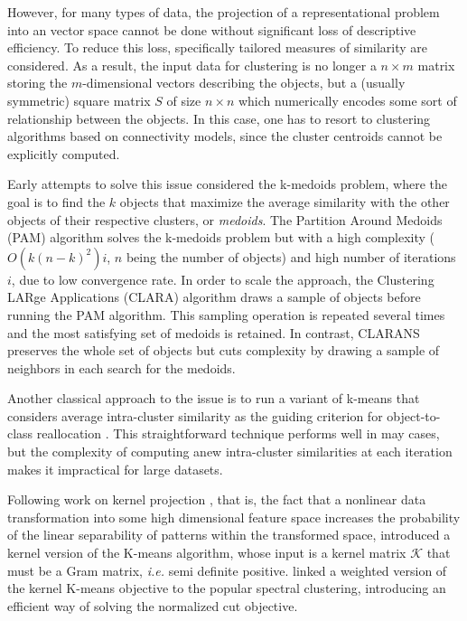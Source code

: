 \documentclass[natbib,smallextended]{svjour3}
\begin{document}
However, for many types of data, the projection of a representational problem into an vector space cannot be done without significant loss of descriptive efficiency. To reduce this loss, specifically tailored measures of similarity are considered. As a result, the input data for clustering is no longer a $n \times m$ matrix storing the $m$-dimensional vectors describing the objects, but a (usually symmetric) square matrix $S$ of size $n \times n$ which numerically encodes some sort of relationship between the objects. In this case, one has to resort to clustering algorithms based on connectivity models, since the cluster centroids cannot be explicitly computed.

Early attempts to solve this issue considered the k-medoids problem, where the goal is to find the $k$ objects that maximize the average similarity with the other objects of their respective clusters, or \emph{medoids}. The Partition Around Medoids (PAM) algorithm \citep{KaufmanRousseeuw90} solves the k-medoids problem but with a high complexity ($O(k(n-k)^2)i$, $n$ being the number of objects) and high number of iterations $i$, due to low convergence rate. In order to scale the approach, the Clustering LARge Applications (CLARA) algorithm \citep{KaufmanRousseeuw90} draws a sample of objects before running the PAM algorithm. This sampling operation is repeated several times and the most satisfying set of medoids is retained. In contrast, CLARANS \citep{Ng:1994:EEC:645920.672827} preserves the whole set of objects but cuts complexity by  drawing a sample of neighbors in each search for the medoids.


Another classical approach to the issue is to run a variant of k-means that considers average intra-cluster similarity as the guiding criterion for object-to-class reallocation \citep[Chapter 10.7]{Duda01}. This straightforward technique performs well in may cases, but the complexity of computing anew intra-cluster similarities at each iteration makes it impractical for large datasets.

Following work on kernel projection \citep{Vapnik:1995:NSL:211359}, that is, the fact that a nonlinear data transformation into some high dimensional feature space increases the probability of the linear separability of patterns within the transformed space, \citet{Girolami:2002:MKC:2325785.2326903} introduced a kernel version of the K-means algorithm, whose input is a kernel matrix $\mathcal{K}$ that must be a Gram matrix, \textit{i.e.} semi definite positive. \citet{Dhillon:2007:WGC:1313055.1313291} linked a weighted version of the kernel K-means objective to the popular spectral clustering, introducing an efficient way of solving the normalized cut objective.
\end{document}
